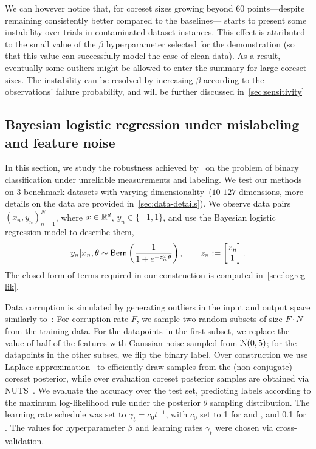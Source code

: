 We can however notice that, for coreset sizes growing beyond 60 points---despite remaining consistently better compared to the baselines---\bcores{} starts to present some instability over trials in contaminated dataset instances. This effect is attributed to the small value of the $\beta$ hyperparameter  selected for the demonstration (so that this value can successfully model the case of clean data). As a result, eventually some outliers might be allowed to enter the summary for large coreset sizes. The instability can be resolved by increasing $\beta$ according to the observations' failure probability, and will be further discussed in~\cref{sec:sensitivity} 


\subsection{Bayesian logistic regression under mislabeling and feature noise}
\label{subsec:logreg-expt}

In this section, we study the robustness achieved by~\bcores{} on the problem of binary classification  under unreliable measurements and labeling. We test our methods on 3 benchmark datasets with varying dimensionality~($10$-$127$ dimensions, more details on the data are provided in~\cref{sec:data-details}). We observe data pairs $(x_n, y_n)_{n=1}^{N}$, where $x\in\mathbb{R}^{d}$, $y_n \in \{-1,1\}$, and use the Bayesian logistic regression model to describe them,
\[
y_n | x_n, \theta \sim {\sf{Bern}} \left( \frac{1}{1+e^{-z_n^T \theta}}\right),
\qquad 
z_n:=\begin{bmatrix}
x_n \\
1
\end{bmatrix}.
\]
The closed form of \blik{} terms required in our construction is computed in~\cref{sec:logreg-lik}. 

Data corruption is simulated by generating outliers in the input and output space similarly to~\citep{futami18}: For corruption rate $F$, we sample two random subsets of size $F\cdot N$ from the training data.  For the datapoints in the first subset, we replace the value of half of the features with Gaussian noise sampled \iid from $\mathcal{N}(0,5)$; for the datapoints in the other subset, we flip the binary label. Over construction we use Laplace approximation~\citep{mackay03} to efficiently draw samples from the (non-conjugate) coreset posterior, while over evaluation coreset posterior samples are obtained via NUTS~\citep{hoffman14}. We evaluate the accuracy over the test set, predicting labels according to the maximum log-likelihood rule under the posterior $\theta$ sampling distribution. The learning rate schedule was set to $\gamma_t=c_0 t^{-1}$, with $c_0$ set to 1 for \sparsevi{} and \bcores{}, and 0.1 for \psvi. 
The values for hyperparameter $\beta$ and learning rates $\gamma_t$ were chosen via cross-validation. 

